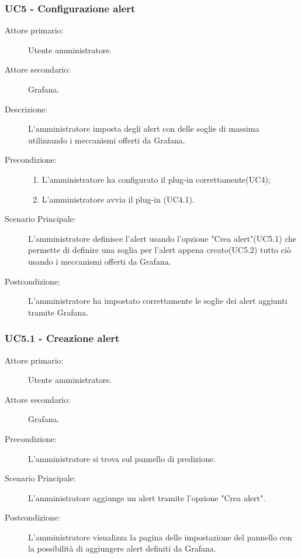 \subsubsection{UC5 - Configurazione alert}
\label{sssec:uc5}
\begin{description}
	\item[Attore primario:] Utente amministratore.
	\item[Attore secondario:] Grafana.
	\item[Descrizione:] L'amministratore imposta degli alert con delle soglie di massima utilizzando i meccanismi offerti da Grafana.
	\item[Precondizione:] 
	\begin{enumerate}
		\item L'amministratore ha configurato il plug-in correttamente(UC4);
		\item L'amministratore avvia il plug-in (UC4.1).
	\end {enumerate}
	\item[Scenario Principale:] L'amministratore definisce l'alert usando l'opzione "Crea alert"(UC5.1) che permette di definire una soglia per l'alert appena creato(UC5.2) tutto ciò usando i meccanismi offerti da Grafana.
	\item[Postcondizione:] L'amministratore ha impostato correttamente le soglie dei alert aggiunti tramite Grafana.
\end{description}

\subsubsection{UC5.1 - Creazione alert}
\label{sssec:uc5.1}
\begin{description}
	\item[Attore primario:] Utente amministratore.
	\item[Attore secondario:] Grafana.
	\item[Precondizione:] L'amministratore si trova sul pannello di predizione.
	\item[Scenario Principale:] L'amministratore aggiunge un alert tramite l'opzione "Crea alert".
	\item[Postcondizione:] L'amministratore visualizza la pagina delle impostazione del pannello con la possibilità di aggiungere alert definiti da Grafana.
\end{description}

